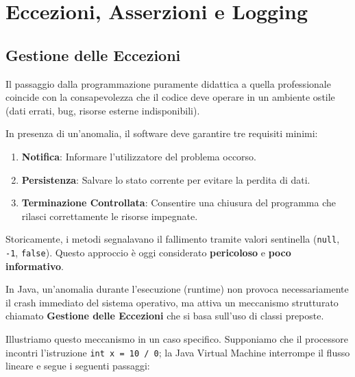 \chapter{Eccezioni, Asserzioni e Logging}

\section{Gestione delle Eccezioni}

Il passaggio dalla programmazione puramente didattica a quella professionale coincide con la consapevolezza che il codice deve operare in un ambiente ostile (dati errati, bug, risorse esterne indisponibili).

In presenza di un'anomalia, il software deve garantire tre requisiti minimi:
\begin{enumerate}
    \item \textbf{Notifica}: Informare l'utilizzatore del problema occorso.
    \item \textbf{Persistenza}: Salvare lo stato corrente per evitare la perdita di dati.
    \item \textbf{Terminazione Controllata}: Consentire una chiusura del programma che rilasci correttamente le risorse impegnate.
\end{enumerate}
\vspace{\baselineskip}

Storicamente, i metodi segnalavano il fallimento tramite valori sentinella (\texttt{null}, \texttt{-1}, \texttt{false}). Questo approccio è oggi considerato \textbf{pericoloso} e \textbf{poco informativo}.

\vspace{\baselineskip}

In Java, un'anomalia durante l'esecuzione (runtime) non provoca necessariamente il crash immediato del sistema operativo, ma attiva un meccanismo strutturato chiamato \textbf{Gestione delle Eccezioni} che si basa sull'uso di classi preposte. 

Illustriamo questo meccanismo in un caso specifico. Supponiamo che il processore incontri l'istruzione \texttt{int x = 10 / 0}; la Java Virtual Machine interrompe il flusso lineare e segue i seguenti passaggi:

